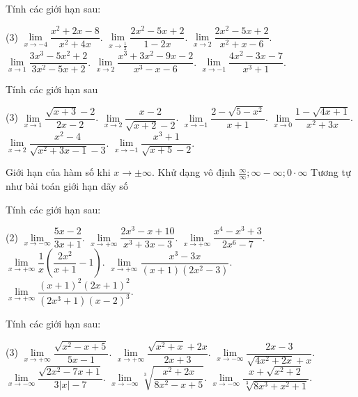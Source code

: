 \begin{vd}
	Tính các giới hạn sau:
	\begin{tasks}(3)
		\task $\lim\limits_{x\to -4}\dfrac{x^2+2x-8}{x^2+4x}$.
		\task $\lim\limits_{x\to \frac{1}{2}}\dfrac{2x^2-5x+2}{1-2x}$.
		\task $\lim\limits_{x\to 2}\dfrac{2x^2-5x+2}{x^2+x-6}$.
		\task $\lim\limits_{x\to 1} \dfrac{3x^3-5x^2+2}{3x^2-5x+2} $.
		\task $\lim\limits_{x\to 2} \dfrac{x^3+3x^2-9x-2}{x^3-x-6}$.
		\task $\lim\limits_{x\to -1} \dfrac{4x^2-3x-7}{x^3+1}$.
	\end{tasks}	
\end{vd}

\begin{vd}
	Tính các giới hạn sau
	\begin{tasks}(3)
		\task $\lim\limits_{x\to 1} \dfrac{\sqrt{x+3}-2}{2x-2} $.
		\task $\lim\limits_{x\to 2} \dfrac{x-2}{\sqrt{x+2}-2} $.
		\task $\lim\limits_{x\to -1} \dfrac{2-\sqrt{5-x^2}}{x+1} $.
		\task $\lim\limits_{x\to 0} \dfrac{1-\sqrt{4x+1}}{x^2+3x} $.
		\task $\lim\limits_{x\to 2} \dfrac{x^2-4}{\sqrt{x^2+3x-1}-3} $.
		\task $\lim\limits_{x\to - 1} \dfrac{x^3+1}{\sqrt{x+5}-2} $.
		\end{tasks}
\end{vd}

\begin{dang}{Giới hạn của hàm số khi $x \to \pm \infty$. Khử dạng vô định $\frac{\infty }{\infty };\infty -\infty ;0\cdot\infty$}
	\iconCV{} Tương tự như bài toán giới hạn dãy số
\end{dang}

\begin{vd}
	Tính các giới hạn sau:
	\begin{tasks}(2)
		\task $\lim\limits_{x\to -\infty}\dfrac{5x-2}{3x+1}$. 	
		\task $\lim\limits_{x\to +\infty}\dfrac{2x^3-x+10}{x^3+3x-3}$. 	
		\task $\lim\limits_{x\to +\infty}\dfrac{x^{4}-x^{3}+3}{2x^{6}-7}$. 	
		\task $\lim\limits_{x\to +\infty}\dfrac{1}{x}\left(\dfrac{2x^2}{x+1}-1\right)$. 	
		\task $\lim\limits_{x\to +\infty}\dfrac{x^3-3x}{(x+1)(2x^2-3)}$. 	
		\task $\lim\limits_{x\to +\infty}\dfrac{(x+1)^{2}(2x+1)^{2}}{(2x^{3}+1)(x-2)^{3}}$. 
	\end{tasks}
\end{vd}


\begin{vd}
	Tính các giới hạn sau:
	\begin{tasks}(3)
		\task	 $\lim\limits_{x\to +\infty}\dfrac{\sqrt{x^2-x+5}}{5x-1}$. 	
		\task	 $\lim\limits_{x\to +\infty}\dfrac{\sqrt{x^2+x}+2x}{2x+3}$. 	
		\task	 $\lim\limits_{x\to -\infty}\dfrac{2x-3}{\sqrt{4x^2+2x}+x}$. 	
		\task	 $\lim\limits_{x\to -\infty}\dfrac{\sqrt{2x^{2}-7x+1}}{3\left| x \right|-7}$. 	
		\task	 $\lim\limits_{x\to -\infty}\sqrt[3]{\dfrac{x^{2}+2x}{8x^{2}-x+5}}$. 	
		\task	 $\lim\limits_{x\to -\infty}\dfrac{x+\sqrt{x^2+2}}{\sqrt[3]{8x^3+x^2+1}}$.
\end{tasks}
\end{vd}



